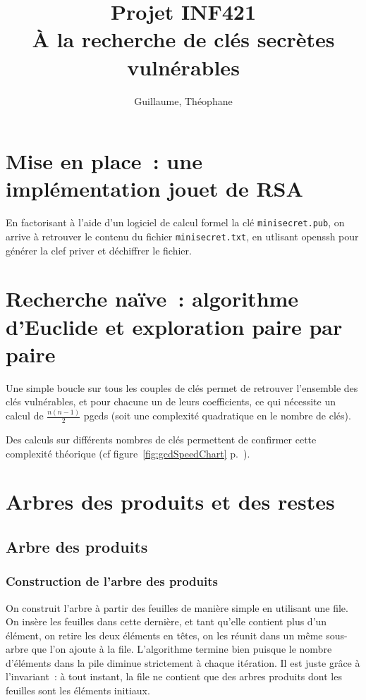 \documentclass[a4paper,10pt]{article}
\title{Projet INF421 \\ À la recherche de clés secrètes vulnérables}
\author{\bsc{Hétier} Guillaume, \bsc{Hufschmitt} Théophane}
\begin{document}
\maketitle

\section{Mise en place~: une implémentation jouet de RSA}
En factorisant à l'aide d'un logiciel de calcul formel la clé \texttt{minisecret.pub}, on arrive à retrouver le contenu du fichier \texttt{minisecret.txt}, en utlisant openssh pour générer la clef priver et déchiffrer le fichier.


\section{Recherche naïve~: algorithme d'Euclide et exploration paire par paire}
Une simple boucle sur tous les couples de clés permet de retrouver l'ensemble des clés vulnérables, et pour chacune un de leurs coefficients, ce qui nécessite un calcul de $\frac{n(n-1)}{2}$ pgcds (soit une complexité quadratique en le nombre de clés).

Des calculs sur différents nombres de clés permettent de confirmer cette complexité théorique (cf figure~\ref{fig:gcdSpeedChart} p.~\pageref{fig:gcdSpeedChart}).
  
  
\section{Arbres des produits et des restes}

  \subsection{Arbre des produits}
  \subsubsection{Construction de l'arbre des produits}
  On construit l'arbre à partir des feuilles de manière simple en utilisant une file. On insère les feuilles dans cette dernière, et tant qu'elle contient plus d'un élément, on retire les deux éléments en têtes, on les réunit dans un même sous-arbre que l'on ajoute à la file.
  L'algorithme termine bien puisque le nombre d'éléments dans la pile diminue strictement à chaque itération. Il est juste grâce à l'invariant~: à tout instant, la file ne contient que des arbres produits dont les feuilles sont les éléments initiaux.
  
\end{document}
